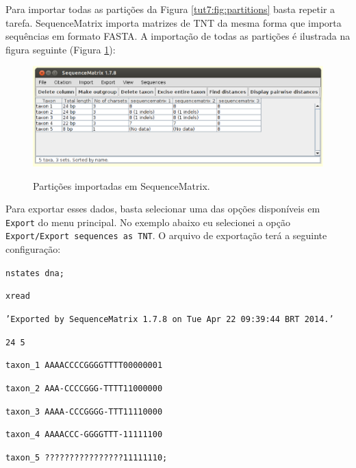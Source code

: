 \begin{refsection}
Para importar todas as partições da Figura \ref{tut7:fig:partitions} basta repetir a tarefa. SequenceMatrix importa matrizes de TNT da mesma forma que importa sequências em formato FASTA. A importação de todas as partições é ilustrada na figura seguinte (Figura \ref{tut7:fig:seqmatrix_4}):

  \begin{figure}[H]
      {\includegraphics[scale=0.5]{figures/tut7/seqmatrix_4.eps}}
	{\caption[Partições importadas em SequenceMatrix]{Partições importadas em SequenceMatrix.}\label{tut7:fig:seqmatrix_4}}
  \end{figure}


Para exportar esses dados, basta selecionar uma das opções disponíveis em \texttt{Export} do menu principal. No exemplo abaixo eu selecionei a opção \texttt{Export/Export sequences as TNT}. O arquivo de exportação terá a seguinte configuração:\\

\scriptsize

\noindent\texttt{nstates~dna;}

\noindent\texttt{xread}

\noindent\texttt{'Exported~by~SequenceMatrix~1.7.8~on~Tue~Apr~22~09:39:44~BRT~2014.'}

\noindent\texttt{24~5}

\noindent\texttt{taxon\_1~AAAACCCCGGGGTTTT00000001}

\noindent\texttt{taxon\_2~AAA-CCCCGGG-TTTT11000000}

\noindent\texttt{taxon\_3~AAAA-CCCGGGG-TTT11110000}

\noindent\texttt{taxon\_4~AAAACCC-GGGGTTT-11111100}

\noindent\texttt{taxon\_5~????????????????11111110;}\\


\end{refsection}
